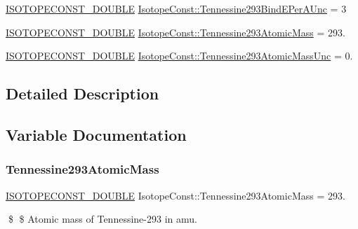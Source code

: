 \begin{DoxyCompactItemize}
\mbox{\hyperlink{group___isotope_const-_macros_ga8f45a7272ce02c0b4c65c44636ed719a}{I\+S\+O\+T\+O\+P\+E\+C\+O\+N\+S\+T\+\_\+\+D\+O\+U\+B\+LE}} \mbox{\hyperlink{group___isotope_const-_tennessine-_ts293_ga535a665d2252c78ce07b403fc702f2f7}{Isotope\+Const\+::\+Tennessine293\+Bind\+E\+Per\+A\+Unc}} = 3
\item 
\mbox{\hyperlink{group___isotope_const-_macros_ga8f45a7272ce02c0b4c65c44636ed719a}{I\+S\+O\+T\+O\+P\+E\+C\+O\+N\+S\+T\+\_\+\+D\+O\+U\+B\+LE}} \mbox{\hyperlink{group___isotope_const-_tennessine-_ts293_gadefe6ba842fde7dbe1a2d34c7a3662c3}{Isotope\+Const\+::\+Tennessine293\+Atomic\+Mass}} = 293.
\item 
\mbox{\hyperlink{group___isotope_const-_macros_ga8f45a7272ce02c0b4c65c44636ed719a}{I\+S\+O\+T\+O\+P\+E\+C\+O\+N\+S\+T\+\_\+\+D\+O\+U\+B\+LE}} \mbox{\hyperlink{group___isotope_const-_tennessine-_ts293_ga360fcb77442d5dfcf2edd3a35f43a063}{Isotope\+Const\+::\+Tennessine293\+Atomic\+Mass\+Unc}} = 0.
\end{DoxyCompactItemize}


\subsection{Detailed Description}


\subsection{Variable Documentation}
\mbox{\label{group___isotope_const-_tennessine-_ts293_gadefe6ba842fde7dbe1a2d34c7a3662c3}} 
\subsubsection{\texorpdfstring{Tennessine293\+Atomic\+Mass}{Tennessine293AtomicMass}}
{\footnotesize\ttfamily \mbox{\hyperlink{group___isotope_const-_macros_ga8f45a7272ce02c0b4c65c44636ed719a}{I\+S\+O\+T\+O\+P\+E\+C\+O\+N\+S\+T\+\_\+\+D\+O\+U\+B\+LE}} Isotope\+Const\+::\+Tennessine293\+Atomic\+Mass = 293.}

\$ \$ Atomic mass of Tennessine-\/293 in amu. \mbox{\label{group___isotope_const-_tennessine-_ts293_ga360fcb77442d5dfcf2edd3a35f43a063}} 
